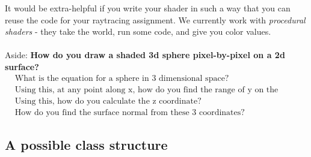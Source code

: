 \documentclass[]{article}
\begin{document}
It would be extra-helpful if you write your shader in such a way that you can reuse the code for your raytracing assignment. We currently work with \emph{procedural shaders} - they take the world, run some code, and give you color values. \\
\\
Aside: \textbf{How do you draw a shaded 3d sphere pixel-by-pixel on a 2d surface?}
\begin{align*}
    &\text{What is the equation for a sphere in 3 dimensional space?} \\
    &\text{Using this, at any point along x, how do you find the range of y on the sphere?} \\
    &\text{Using this, how do you calculate the z coordinate?} \\
    &\text{How do you find the surface normal from these 3 coordinates?}
\end{align*}

\subsection{A possible class structure}
\end{document}

